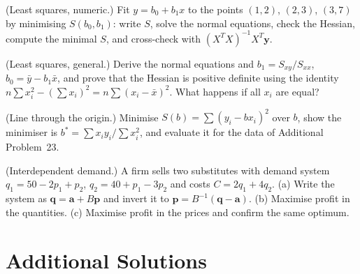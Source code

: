 \begin{problems}
    \item (Least squares, numeric.) Fit $y = b_0 + b_1 x$ to the points $(1, 2)$, $(2, 3)$, $(3, 7)$ by minimising $S(b_0, b_1)$: write $S$, solve the normal equations, check the Hessian, compute the minimal $S$, and cross-check with $(X^T X)^{-1} X^T \mathbf{y}$.
    \item (Least squares, general.) Derive the normal equations and $b_1 = S_{xy}/S_{xx}$, $b_0 = \bar y - b_1 \bar x$, and prove that the Hessian is positive definite using the identity $n \sum x_i^2 - (\sum x_i)^2 = n \sum (x_i - \bar x)^2$. What happens if all $x_i$ are equal?
    \item (Line through the origin.) Minimise $S(b) = \sum (y_i - b x_i)^2$ over $b$, show the minimiser is $b^* = \sum x_i y_i / \sum x_i^2$, and evaluate it for the data of Additional Problem~23.
    \item (Interdependent demand.) A firm sells two substitutes with demand system $q_1 = 50 - 2 p_1 + p_2$, $q_2 = 40 + p_1 - 3 p_2$ and costs $C = 2 q_1 + 4 q_2$. (a) Write the system as $\mathbf{q} = \mathbf{a} + B \mathbf{p}$ and invert it to $\mathbf{p} = B^{-1} (\mathbf{q} - \mathbf{a})$. (b) Maximise profit in the quantities. (c) Maximise profit in the prices and confirm the same optimum.
\end{problems}

\section{Additional Solutions}

